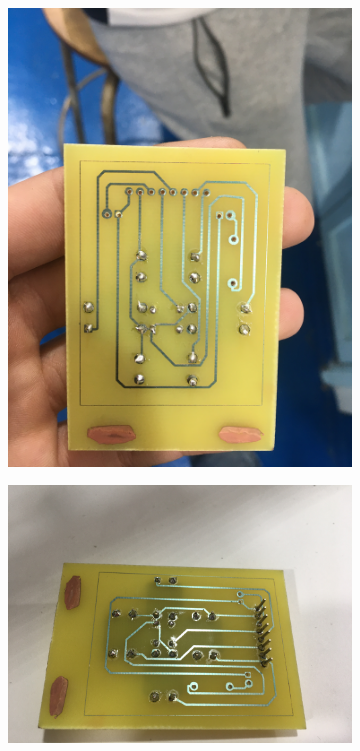 \begin{figure}[!htbp]
    \centering
    \begin{subfigure}[m]{.31\linewidth}
        \centering
        \includegraphics[width=\textwidth]{assets/realisation/cartes/2022-03-25 15.34.40.jpeg}
    \end{subfigure}
    \hfill
    \begin{subfigure}[m]{.31\linewidth}
        \centering
        \includegraphics[width=\textwidth]{assets/realisation/cartes/2022-03-25 16.30.00.jpeg}

\end{subfigure}
\end{figure}
